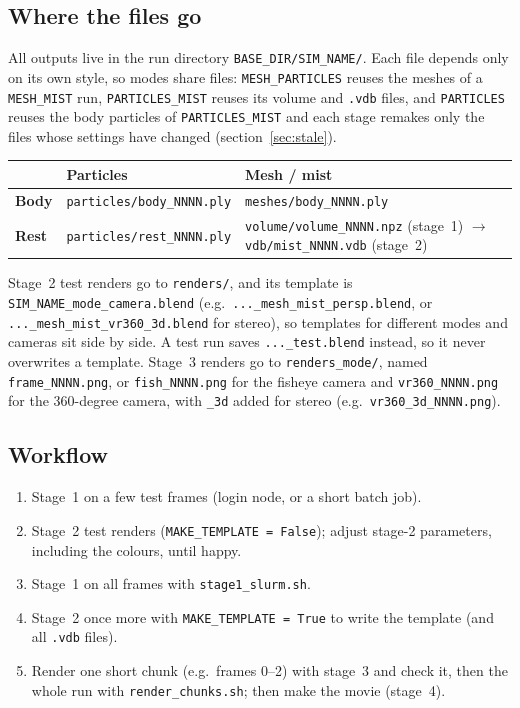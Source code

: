 \documentclass[11pt]{article}
\newcommand{\pc}[1]{\texttt{#1}}
\begin{document}
\subsection{Where the files go}
All outputs live in the run directory \pc{BASE\_DIR/SIM\_NAME/}. Each file depends only on its own style, so modes share files: \pc{MESH\_PARTICLES} reuses the meshes of a \pc{MESH\_MIST} run, \pc{PARTICLES\_MIST} reuses its volume and \pc{.vdb} files, and \pc{PARTICLES} reuses the body particles of \pc{PARTICLES\_MIST} and each stage remakes only the files whose settings have changed (section~\ref{sec:stale}).
 
\begin{center}\small
\begin{tabular}{@{}P{3.0cm} P{5.6cm} P{5.9cm}@{}}
\hline
& \textbf{Particles} & \textbf{Mesh / mist} \\
\hline
\textbf{Body} & \pc{particles/body\_NNNN.ply} & \pc{meshes/body\_NNNN.ply} \\
\textbf{Rest} & \pc{particles/rest\_NNNN.ply} & \pc{volume/volume\_NNNN.npz} (stage~1) $\rightarrow$ \pc{vdb/mist\_NNNN.vdb} (stage~2) \\
\hline
\end{tabular}
\end{center}
 
Stage~2 test renders go to \pc{renders/}, and its template is \pc{SIM\_NAME\_mode\_camera.blend} (e.g.\ \pc{...\_mesh\_mist\_persp.blend}, or \pc{...\_mesh\_mist\_vr360\_3d.blend} for stereo), so templates for different modes and cameras sit side by side. A test run saves \pc{...\_test.blend} instead, so it never overwrites a template. Stage~3 renders go to \pc{renders\_mode/}, named \pc{frame\_NNNN.png}, or \pc{fish\_NNNN.png} for the fisheye camera and \pc{vr360\_NNNN.png} for the 360-degree camera, with \pc{\_3d} added for stereo (e.g.\ \pc{vr360\_3d\_NNNN.png}).
 
\subsection{Workflow}
\begin{enumerate}
  \item Stage~1 on a few test frames (login node, or a short batch job).
  \item Stage~2 test renders (\pc{MAKE\_TEMPLATE = False}); adjust stage-2 parameters, including the colours, until happy.
  \item Stage~1 on all frames with \pc{stage1\_slurm.sh}.
  \item Stage~2 once more with \pc{MAKE\_TEMPLATE = True} to write the template (and all \pc{.vdb} files).
  \item Render one short chunk (e.g.\ frames 0--2) with stage~3 and check it, then the whole run with \pc{render\_chunks.sh}; then make the movie (stage~4).
\end{enumerate}
 
\end{document}
